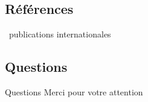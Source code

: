 \documentclass[english,french,dvips,10pt]{mybeamer}
\begin{document}
	\subsection{Références}
	\nocite{Simard-2009}
	\nocite{Simard-2010a}
	\nocite{Simard-2010b}
	\nocite{Simard-2010c}
	\nocite{Simard-2011a}
	\nocite{Simard-2011b}
	\nocite{Simard-2012a}
	\nocite{Simard-2012b}
	\nocite{Simard-2012c}
	\nocite{Simard-2012d}
	\nocite{Girard-2012a}
	\nocite{Girard-2012b}
	\begin{myframe}{~publications internationales}
		\printbibliography[type=article,category=myrefs]
		\printbibliography[type=inproceedings,category=myrefs]
	\end{myframe}
	\subsection{Questions}
	\begin{myframe}{Questions}
		Merci pour votre attention
	\end{myframe}
\end{document}
